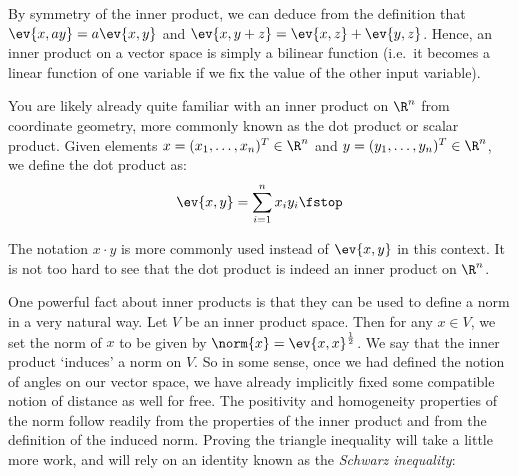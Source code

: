 By symmetry of the inner product, we can deduce from the definition that \( \ev{x,ay}=a\ev{x,y} \) and \( \ev{x,y+z}=\ev{x,z}+\ev{y,z} \). Hence, an inner product on a vector space is simply a bilinear function (i.e.\ it becomes a linear function of one variable if we fix the value of the other input variable).

\vspace{3mm}

You are likely already quite familiar with an inner product on \( \R^n \) from coordinate geometry, more commonly known as the dot product or scalar product. Given elements \( x=(x_1,\dots,x_n)^T\in\R^n \) and \( y=(y_1,\dots,y_n)^T\in\R^n \), we define the dot product as:
\[ \ev{x,y}=\sum_{i=1}^nx_iy_i\fstop \]

The notation \( x\cdot y \) is more commonly used instead of \( \ev{x,y} \) in this context. It is not too hard to see that the dot product is indeed an inner product on \( \R^n \).

\vspace{3mm}

One powerful fact about inner products is that they can be used to define a norm in a very natural way. Let \( V \) be an inner product space. Then for any \( x\in V \), we set the norm of \( x \) to be given by \( \norm{x}=\ev{x,x}^{\frac{1}{2}} \). We say that the inner product `induces' a norm on \( V \). So in some sense, once we had defined the notion of angles on our vector space, we have already implicitly fixed some compatible notion of distance as well for free. The positivity and homogeneity properties of the norm follow readily from the properties of the inner product and from the definition of the induced norm. Proving the triangle inequality will take a little more work, and will rely on an identity known as the \emph{Schwarz inequality}:

